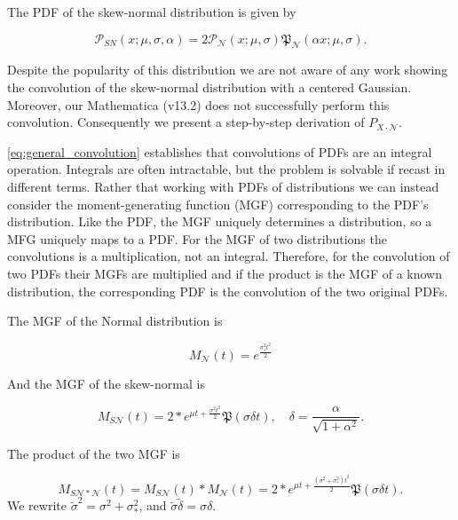 \documentclass[twocolumn]{aastex631}
\newcommand{\mfk}[1]{\mathfrak{#1}}
\newcommand{\mcal}[1]{\mathcal{#1}}
\newcommand{\Exp}[1]{e^{#1}}
\newcommand{\pdf}{\mcal{P}}
\newcommand{\cdf}{\mfk{P}}
\begin{document}
{        The PDF of the skew-normal distribution is given by

        \begin{equation}
            \pdf_{SN}(x;\mu,\sigma,\alpha) = 2\pdf_{\mcal{N}}(x;\mu,\sigma)\cdf_{\mcal{N}}(\alpha x;\mu,\sigma).
        \end{equation}

        Despite the popularity of this distribution we are not aware of any work
        showing the convolution of the skew-normal distribution with a centered
        Gaussian. Moreover, our Mathematica (v13.2) does not successfully
        perform this convolution. Consequently we present a step-by-step
        derivation of $P_{X\cdot\mcal{N}}$.

        \autoref{eq:general_convolution} establishes that convolutions of PDFs
        are an integral operation. Integrals are often intractable, but the
        problem is solvable if recast in different terms. Rather that working
        with PDFs of distributions we can instead consider the moment-generating
        function (MGF) corresponding to the PDF's distribution. Like the PDF,
        the MGF uniquely determines a distribution, so a MFG uniquely maps to a
        PDF. For the MGF of two distributions the convolutions is a
        multiplication, not an integral.  Therefore, for the convolution of two
        PDFs their MGFs are multiplied and if the product is the MGF of a known
        distribution, the corresponding PDF is the convolution of the two
        original PDFs.

        The MGF of the Normal distribution is

        \begin{equation} \label{eq:mgf_normal}
            M_{\mcal{N}}(t) = \Exp{\frac{\sigma_*^2 t^2}{2}}
        \end{equation}

        And the MGF of the skew-normal is

        \begin{equation} \label{eq:mgf_skewnormal}
            M_{S\mcal{N}}(t) = 2 * \Exp{\mu t + \frac{\sigma^2 t^2}{2}} \cdf(\sigma \delta t), \quad \delta = \frac{\alpha}{\sqrt{1 + \alpha^2}}.
        \end{equation}

        The product of the two MGF is

        \begin{equation}
            M_{S\mcal{N}*\mcal{N}}(t) = M_{S\mcal{N}}(t) * M_{\mcal{N}}(t) = 2 * \Exp{\mu t + \frac{(\sigma^2 + \sigma_*^2) t^2}{2}} \cdf(\sigma \delta t).
        \end{equation}
        We rewrite $\tilde\sigma^2 = \sigma^2 + \sigma_*^2$, and $\tilde{\sigma} \tilde{\delta} = \sigma \delta$.

}
\end{document}
